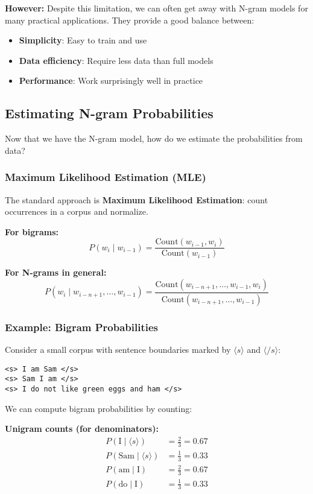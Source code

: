 \documentclass[11pt,a4paper]{article}
\theoremstyle{definition}
\theoremstyle{plain}
\theoremstyle{remark}
\begin{document}
\textbf{However:} Despite this limitation, we can often get away with N-gram models for many practical applications. They provide a good balance between:
\begin{itemize}
    \item \textbf{Simplicity}: Easy to train and use
    \item \textbf{Data efficiency}: Require less data than full models
    \item \textbf{Performance}: Work surprisingly well in practice
\end{itemize}

\subsection{Estimating N-gram Probabilities}

Now that we have the N-gram model, how do we estimate the probabilities from data?

\subsubsection{Maximum Likelihood Estimation (MLE)}

The standard approach is \textbf{Maximum Likelihood Estimation}: count occurrences in a corpus and normalize.

\textbf{For bigrams:}
\[
P(w_i \mid w_{i-1}) = \frac{\text{Count}(w_{i-1}, w_i)}{\text{Count}(w_{i-1})}
\]

\textbf{For N-grams in general:}
\[
P(w_i \mid w_{i-n+1}, \ldots, w_{i-1}) = \frac{\text{Count}(w_{i-n+1}, \ldots, w_{i-1}, w_i)}{\text{Count}(w_{i-n+1}, \ldots, w_{i-1})}
\]

\subsubsection{Example: Bigram Probabilities}

Consider a small corpus with sentence boundaries marked by $\langle s \rangle$ and $\langle /s \rangle$:

\begin{verbatim}
<s> I am Sam </s>
<s> Sam I am </s>
<s> I do not like green eggs and ham </s>
\end{verbatim}

We can compute bigram probabilities by counting:

\textbf{Unigram counts (for denominators):}
\begin{align*}
P(\text{I} \mid \langle s \rangle) &= \frac{2}{3} = 0.67 \\
P(\text{Sam} \mid \langle s \rangle) &= \frac{1}{3} = 0.33 \\
P(\text{am} \mid \text{I}) &= \frac{2}{3} = 0.67 \\
P(\text{do} \mid \text{I}) &= \frac{1}{3} = 0.33
\end{align*}
\end{document}

